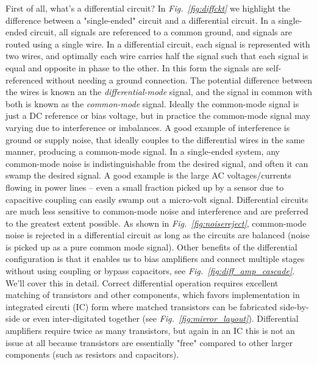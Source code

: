 First of all, what's a differential circuit?  In \emph{Fig.~\ref{fig:diffckt}} we highlight the difference between a "single-ended" circuit and a differential circuit. In a single-ended circuit, all signals are referenced to a common ground, and signals are routed using a single wire.  In a differential circuit, each signal is represented with two wires, and optimally each wire carries half the signal such that each signal is equal and opposite in phase to the other.  In this form the signals are self-referenced without needing a ground connection.   The potential difference between the wires is known an the \emph{differential-mode} signal, and the signal in common with both is known as the \emph{common-mode} signal.  Ideally the common-mode signal is just a DC reference or bias voltage, but in practice the common-mode signal may varying due to interference or imbalances.  A good example of interference is ground or supply noise, that ideally couples to the differential wires in the same manner, producing a common-mode signal.  In a single-ended system, any common-mode noise is indistinguishable from the desired signal, and often it can swamp the desired signal.  A good example is the large AC voltages/currents flowing in power lines -- even a small fraction picked up by a sensor due to capacitive coupling can easily swamp out a micro-volt signal.  
Differential circuits are much less sensitive to common-mode noise and interference and are preferred to the greatest extent possible.  As shown in \emph{Fig.~\ref{fig:noisereject}}, common-mode noise is rejected in a differential circuit as long as the circuits are balanced (noise is picked up as a pure common mode signal).  Other benefits of the differential configuration is that it enables us to bias amplifiers and connect multiple stages without using coupling or bypass capacitors, see \emph{Fig.~\ref{fig:diff_amp_cascade}}.  We'll cover this in detail.  
Correct differential operation requires excellent matching of transistors and other components, which favors implementation in integrated circuti (IC) form where matched transistors can be fabricated side-by-side or even inter-digitated together (see \emph{Fig.~\ref{fig:mirror_layout}}).  Differential amplifiers require twice as many transistors, but again in an IC this is not an issue at all because transistors are essentially "free" compared to other larger components (such as resistors and capacitors).
